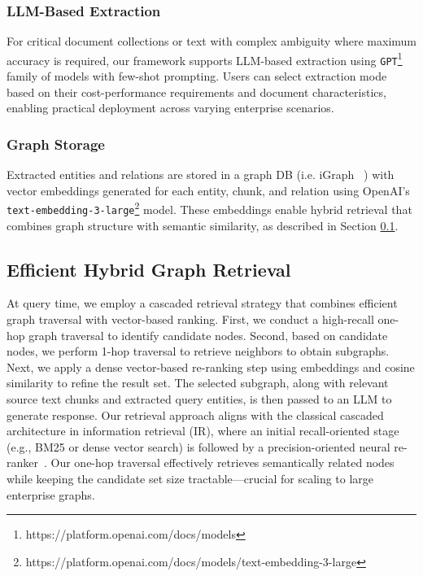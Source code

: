 \documentclass[runningheads]{llncs}
\begin{document}
\subsubsection{LLM-Based Extraction} For critical document collections or text with complex ambiguity where maximum accuracy is required, our framework supports LLM-based extraction using \texttt{GPT}\footnote{https://platform.openai.com/docs/models} family of models with few-shot prompting. Users can select extraction mode based on their cost-performance requirements and document characteristics, enabling practical deployment across varying enterprise scenarios.
\subsubsection{Graph Storage} Extracted entities and relations are stored in a graph DB (i.e. iGraph ~\cite{igraph}) with vector embeddings generated for each entity, chunk, and relation using OpenAI's \texttt{text-embedding-3-large}\footnote{https://platform.openai.com/docs/models/text-embedding-3-large} model. These embeddings enable hybrid retrieval that combines graph structure with semantic similarity, as described in Section \ref{sec:eff_hybrid_graph}.
\vspace{-8mm}
\subsection{Efficient Hybrid Graph Retrieval}
\label{sec:eff_hybrid_graph}
\vspace{-10mm}
At query time, we employ a cascaded retrieval strategy that combines efficient graph traversal with vector-based ranking. First, we conduct a high-recall one-hop graph traversal to identify candidate nodes. Second, based on candidate nodes, we perform 1-hop traversal to retrieve neighbors to obtain subgraphs. Next, we apply a dense vector-based re-ranking step using embeddings and cosine similarity to refine the result set. The selected subgraph, along with relevant source text chunks and extracted query entities, is then passed to an LLM to generate response. Our retrieval approach aligns with the classical cascaded architecture in information retrieval (IR), where an initial recall-oriented stage (e.g., BM25 or dense vector search) is followed by a precision-oriented neural re-ranker~\cite{mogotsi2010christopher,nogueira2020passagererankingbert,adjali2024multi}. Our one-hop traversal effectively retrieves semantically related nodes while keeping the candidate set size tractable—crucial for scaling to large enterprise graphs.
\end{document}
